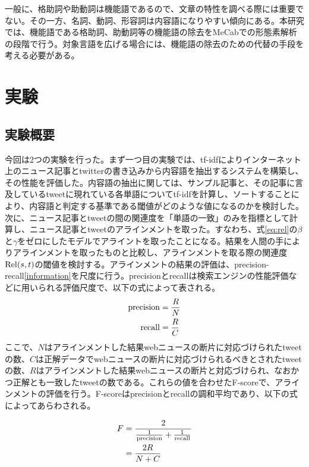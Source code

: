 \documentclass[12pt]{jarticle}
\begin{document}
一般に、格助詞や助動詞は機能語であるので、文章の特性を調べる際には重要でない。その一方、名詞、動詞、形容詞は内容語になりやすい傾向にある。本研究では、機能語である格助詞、助動詞等の機能語の除去をMeCabでの形態素解析の段階で行う。対象言語を広げる場合には、機能語の除去のための代替の手段を考える必要がある。

\section{実験}
\subsection{実験概要}
今回は2つの実験を行った。まず一つ目の実験では、tf-idfによりインターネット上のニュース記事とtwitterの書き込みから内容語を抽出するシステムを構築し、その性能を評価した。内容語の抽出に関しては、サンプル記事と、その記事に言及しているtweetに現れている各単語についてtf-idfを計算し、ソートすることにより、内容語と判定する基準である閾値がどのような値になるのかを検討した。次に、ニュース記事とtweetの間の関連度を「単語の一致」のみを指標として計算し、ニュース記事とtweetのアラインメントを取った。すなわち、式\ref{eq:rel}の$\beta$と$\gamma$をゼロにしたモデルでアライントを取ったことになる。結果を人間の手によりアラインメントを取ったものと比較し、アラインメントを取る際の関連度${\rm Rel}(s, t)$の閾値を検討する。アラインメントの結果の評価は、precision-recall\ref{information}を尺度に行う。precisionとrecallは検索エンジンの性能評価などに用いられる評価尺度で、以下の式によって表される。
\begin{align}
  {\rm precision} &= \frac{R}{N}\\
  {\rm recall} &= \frac{R}{C}
\end{align}
  ここで、$N$はアラインメントした結果webニュースの断片に対応づけられたtweetの数、$C$は正解データでwebニュースの断片に対応づけられるべきとされたtweetの数、$R$はアラインメントした結果webニュースの断片と対応づけられ、なおかつ正解とも一致したtweetの数である。これらの値を合わせたF-scoreで、アラインメントの評価を行う。F-scoreはprecisionとrecallの調和平均であり、以下の式によってあらわされる。

\begin{align}
  F &= \frac{2}{\frac{1}{\rm precision} + \frac{1}{\rm recall}} \\
    &= \frac{2R}{N+C}
\end{align}
\end{document}
